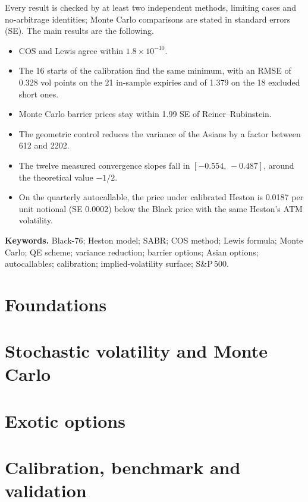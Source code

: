 \documentclass[11pt,a4paper,openany]{book}
\makeatletter
\theoremstyle{definition}
\theoremstyle{plain}
\numberwithin{equation}{chapter}
\renewcommand\cleardoublepage{\clearpage\if@twoside\ifodd\c@page\else
  \hbox{}\thispagestyle{empty}\newpage\fi\fi}
\makeatother
\begin{document}
Every result is checked by at least two independent methods, limiting cases and no-arbitrage identities; Monte Carlo
comparisons are stated in standard errors (SE). The main results are the following.
\begin{itemize}[leftmargin=1.5em,itemsep=1pt,topsep=3pt]
\item COS and Lewis agree within $1.8\times10^{-10}$.
\item The 16 starts of the calibration find the same minimum, with an RMSE of 0.328 vol points on the 21 in-sample
expiries and of 1.379 on the 18 excluded short ones.
\item Monte Carlo barrier prices stay within 1.99 SE of Reiner--Rubinstein.
\item The geometric control reduces the variance of the Asians by a factor between 612 and 2202.
\item The twelve measured convergence slopes fall in $[-0.554,\,-0.487]$, around the theoretical value $-1/2$.
\item On the quarterly autocallable, the price under calibrated Heston is 0.0187 per unit notional (SE 0.0002) below
the Black price with the same Heston's ATM volatility.
\end{itemize}

\vspace{1.5\baselineskip}
\noindent\textbf{Keywords.} Black-76; Heston model; SABR; COS method; Lewis formula; Monte Carlo; QE scheme; variance
reduction; barrier options; Asian options; autocallables; calibration; implied-volatility surface; S\&P\,500.

\cleardoublepage
\tableofcontents

\cleardoublepage


\mainmatter
\part{Foundations}





\part{Stochastic volatility and Monte Carlo}




\part{Exotic options}




\part{Calibration, benchmark and validation}




\appendix


\end{document}
